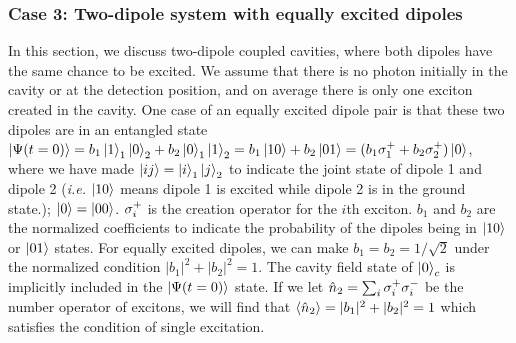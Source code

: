 \subsubsection{Case 3: Two-dipole system with equally excited dipoles}
In this section, we discuss two-dipole coupled cavities, where both dipoles have the same chance to be excited. We assume that there is no photon initially in the cavity or at the detection position, and on average there is only one exciton created in the cavity. One case of an equally excited dipole pair is that these two dipoles are in an entangled state $\mathinner{|{\Psi(t=0)}\rangle}=b_1\mathinner{|{1}\rangle}_1\mathinner{|{0}\rangle}_2 + b_2\mathinner{|{0}\rangle}_1\mathinner{|{1}\rangle}_2 =b_1\mathinner{|{10}\rangle} + b_2\mathinner{|{01}\rangle} = (b_1\sigma^{+}_1+b_2\sigma^{+}_2)\mathinner{|{0}\rangle}$, where we have made $\mathinner{|{ij}\rangle}=\mathinner{|{i}\rangle}_1\mathinner{|{j}\rangle}_2$ to indicate the joint state of dipole 1 and dipole 2 ({\it i.e.} $\mathinner{|{10}\rangle}$ means dipole 1 is excited while dipole 2 is in the ground state.); $\mathinner{|{0}\rangle}=\mathinner{|{00}\rangle}$. $\sigma^{+}_i$ is the creation operator for the $i$th exciton. $b_1$ and $b_2$ are the normalized coefficients to indicate the probability of the dipoles being in $\mathinner{|{10}\rangle}$ or $\mathinner{|{01}\rangle}$ states. For equally excited dipoles, we can make $b_1=b_2=1/\sqrt{2}$ under the normalized condition $|b_1|^2+|b_2|^2=1$. The cavity field state of $\mathinner{|{0}\rangle}_c$ is implicitly included in the $\mathinner{|{\Psi(t=0)}\rangle}$ state. If we let $\hat{n}_2=\sum_i{\sigma^{+}_i\sigma^{-}_i}$ be the number operator of excitons, we will find that $\mathinner{\langle{\hat{n}_2}\rangle}=|b_1|^2+|b_2|^2=1$ which satisfies the condition of single excitation.

